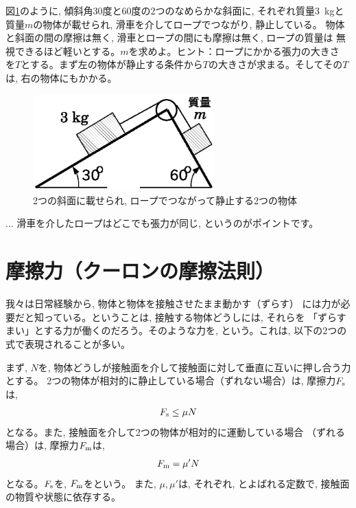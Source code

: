 %
\begin{q}\label{q:force_rope2}
図\ref{fig:slope4}のように, 傾斜角30度と60度の2つのなめらかな斜面に, 
それぞれ質量3~kgと質量$m$の物体が載せられ, 滑車を介してロープでつながり, 静止している。
物体と斜面の間の摩擦は無く, 滑車とロープの間にも摩擦は無く, ロープの質量は
無視できるほど軽いとする。$m$を求めよ。ヒント：ロープにかかる張力の大きさ
を$T$とする。まず左の物体が静止する条件から$T$の大きさが求まる。そしてその$T$は, 
右の物体にもかかる。
\begin{figure}[h]
    \centering
    \includegraphics[width=7cm]{slope4.eps}
    \caption{2つの斜面に載せられ, ロープでつながって静止する2つの物体}\label{fig:slope4}
\end{figure}
\end{q}\mv

\begin{faq}{\small{}
... 滑車を介したロープはどこでも張力が同じ, というのがポイントです。}\end{faq}
\hv



\section{摩擦力（クーロンの摩擦法則）}

我々は日常経験から, 物体と物体を接触させたまま動かす（ずらす）
には力が必要だと知っている。ということは, 接触する物体どうしには, それらを
「ずらすまい」とする力が働くのだろう。そのような力を, 
という。これは, 以下の2つの式で表現されることが多い。

まず, $N$を, 物体どうしが接触面を介して接触面に対して垂直に互いに押し合う力とする。
2つの物体が相対的に静止している場合（ずれない場合）は, 摩擦力$F_{\text s}$は, 
\begin{eqnarray}
F_{\text s} \leq \mu N\label{eq:friction_s}
\end{eqnarray}
となる。また, 接触面を介して2つの物体が相対的に運動している場合
（ずれる場合）は, 摩擦力$F_{\text m}$は, 
\begin{eqnarray}
F_{\text m}=\mu' N\label{eq:friction_m}
\end{eqnarray}
となる。$F_{\text s}$を, 
$F_{\text m}$をという。
また, $\mu, \mu'$は, それぞれ, 
とよばれる定数で, 接触面の物質や状態に依存する。

